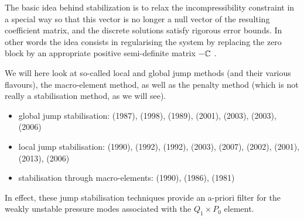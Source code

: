 The basic idea behind stabilization is to relax the incompressibility constraint in a special way so that this vector is no longer a null vector of the resulting coefficient matrix, and the discrete solutions satisfy rigorous error bounds. In other words the idea consists in regularising the system by replacing the zero block by an appropriate positive semi-definite matrix $-{\mathbb{C}}$ \cite{sike90}.

We will here look at so-called local and global jump methods (and their various flavours), the macro-element method, as well as the penalty method (which is not really a stabilisation method, as we will see).

\begin{itemize}
\item global jump stabilisation: 
\textcite{hufr87} (1987), \textcite{nosi98} (1998), \textcite{dowa89} (1989),
\textcite{chco01} (2001), \textcite{cao03} (2003),
\textcite{eguc03} (2003), \textcite{lica06} (2006)
\item local jump stabilisation: 
\textcite{sike90} (1990), \textcite{kesi92} (1992), \textcite{vibo92} (1992), \textcite{cao03} (2003), 
\textcite{qizh07} (2007), \textcite{chri02} (2002), \textcite{chco01} (2001),
\textcite{lisi13} (2013), \textcite{lica06} (2006)
\item stabilisation through macro-elements:
\textcite{fobo90} (1990), \textcite{leru86} (1986), \textcite{leta81} (1981)
\end{itemize}

In effect, these jump stabilisation techniques provide an a-priori filter for the weakly unstable pressure modes associated with the $Q_1\times P_0$ element. 


